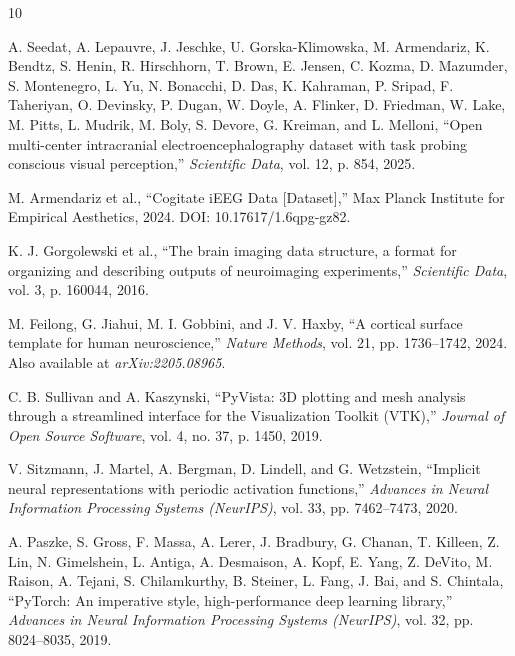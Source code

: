 \documentclass[twocolumn]{article}
\begin{document}
	
	\begin{thebibliography}{10}
		
		A. Seedat, A. Lepauvre, J. Jeschke, U. Gorska-Klimowska, M. Armendariz, K. Bendtz, S. Henin, R. Hirschhorn, T. Brown, E. Jensen, C. Kozma, D. Mazumder, S. Montenegro, L. Yu, N. Bonacchi, D. Das, K. Kahraman, P. Sripad, F. Taheriyan, O. Devinsky, P. Dugan, W. Doyle, A. Flinker, D. Friedman, W. Lake, M. Pitts, L. Mudrik, M. Boly, S. Devore, G. Kreiman, and L. Melloni, ``Open multi-center intracranial electroencephalography dataset with task probing conscious visual perception,'' \textit{Scientific Data}, vol. 12, p. 854, 2025.
		
		M. Armendariz et al., ``Cogitate iEEG Data [Dataset],'' Max Planck Institute for Empirical Aesthetics, 2024. DOI: 10.17617/1.6qpg-gz82.
		
		K. J. Gorgolewski et al., ``The brain imaging data structure, a format for organizing and describing outputs of neuroimaging experiments,'' \textit{Scientific Data}, vol. 3, p. 160044, 2016.
		
		M. Feilong, G. Jiahui, M. I. Gobbini, and J. V. Haxby, ``A cortical surface template for human neuroscience,'' \textit{Nature Methods}, vol. 21, pp. 1736--1742, 2024. Also available at \textit{arXiv:2205.08965}.
		
		C. B. Sullivan and A. Kaszynski, ``PyVista: 3D plotting and mesh analysis through a streamlined interface for the Visualization Toolkit (VTK),'' \textit{Journal of Open Source Software}, vol. 4, no. 37, p. 1450, 2019.
		
		V. Sitzmann, J. Martel, A. Bergman, D. Lindell, and G. Wetzstein, ``Implicit neural representations with periodic activation functions,'' \textit{Advances in Neural Information Processing Systems (NeurIPS)}, vol. 33, pp. 7462--7473, 2020.
		
		A. Paszke, S. Gross, F. Massa, A. Lerer, J. Bradbury, G. Chanan, T. Killeen, Z. Lin, N. Gimelshein, L. Antiga, A. Desmaison, A. Kopf, E. Yang, Z. DeVito, M. Raison, A. Tejani, S. Chilamkurthy, B. Steiner, L. Fang, J. Bai, and S. Chintala, ``PyTorch: An imperative style, high-performance deep learning library,'' \textit{Advances in Neural Information Processing Systems (NeurIPS)}, vol. 32, pp. 8024--8035, 2019.
		

\end{thebibliography}
\end{document}
